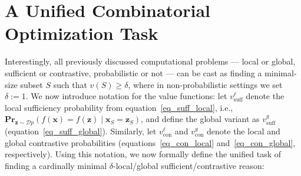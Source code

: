\documentclass{article}
\newcommand{\z}{\textbf{z}}
\newcommand{\x}{\textbf{x}}
\newcommand{\guy}[1]{\marginpar{\textcolor{orange}{GuyK: #1}}}
\begin{document}



\section{A Unified Combinatorial Optimization Task}

Interestingly, all previously discussed computational problems --- local or global, sufficient or contrastive, probabilistic or not --- can be cast as finding a minimal-size subset $S$ such that $v(S) \geq \delta$, where in non-probabilistic settings we set $\delta := 1$. We now introduce notation for the value functions: let $v^{\ell}_{\text{suff}}$ denote the local sufficiency probability from equation~\ref{eq_suff_local}, i.e., $\textbf{Pr}_{\z\sim\mathcal{D}p}(f(\x)=f(\z) \mid \x_S=\z_S)$, and define the global variant as $v^{g}_{\text{suff}}$ (equation~\ref{eq_suff_global}). Similarly, let $v^{\ell}_{\text{con}}$ and $v^{g}_{\text{con}}$ denote the local and global contrastive probabilities (equations~\ref{eq_con_local} and~\ref{eq_con_global}, respectively). Using this notation, we now formally define the unified task of finding a cardinally minimal $\delta$-local/global sufficient/contrastive reason:
\end{document}
